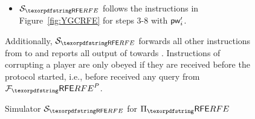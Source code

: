 \begin{figure}[!ht]
{\begin{minipage}{\linewidth-10pt}
\begin{itemize}
\begin{itemize}
\begin{itemize}
\begin{itemize}
\item If $d(\apw, \otherpw') \leq \delta$ sets $\outp = 1$, and sets $\outp = 0$ otherwise.
\item Uses the privacy simulator for the garbling scheme to generate $(\gfunc_{\aindex}, \ginp_{\aindex}, \deinp_{\aindex}) \gets \simulator(1^{\secparam}, \func, \outp)$.
\item Parses $(\ginp_{\aindex,\aindex}, \ginp_{\aindex,\otherindex}) \gets \ginp_{\aindex}$.
\item Sends $\ginp_{\aindex,\otherindex}$ to $\otherparty$ as the OT output.
\end{itemize}
\item Plays an OT receiver honestly with $\apw'$.
\end{itemize}
\item 
$\SimYGCRFE$ follows the instructions in Figure~\ref{fig:YGCRFE} for steps 3-8 with $\mathsf{pw}_i'$.
\end{itemize}
\end{itemize}
Additionally, $\SimYGCRFE$ forwards all other instructions from \Env to \AdvA and reports all output of \AdvA towards \Env. Instructions of corrupting a player are only obeyed if they are received before the protocol started, i.e., before \Sim received any \NewSession query from $\Frfe^{P}$.
\end{minipage}}
\caption{Simulator $\SimYGCRFE$ for $\Prfe$} 
\label{fig:SimulatorYGCRFE}
\end{figure}